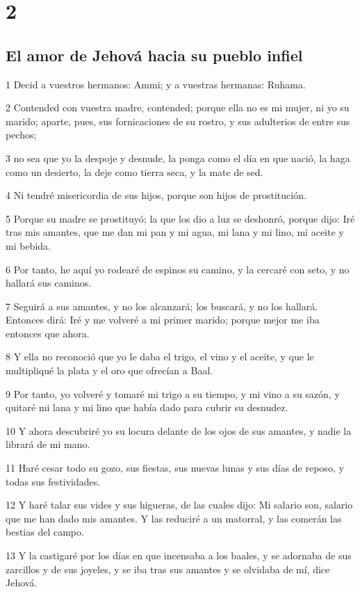 \chapter{2}

\section*{El amor de Jehová hacia su pueblo infiel}

\par 1 Decid a vuestros hermanos: Ammi; y a vuestras hermanas: Ruhama.
\par 2 Contended con vuestra madre, contended; porque ella no es mi mujer, ni yo su marido; aparte, pues, sus fornicaciones de su rostro, y sus adulterios de entre sus pechos;
\par 3 no sea que yo la despoje y desnude, la ponga como el día en que nació, la haga como un desierto, la deje como tierra seca, y la mate de sed.
\par 4 Ni tendré misericordia de sus hijos, porque son hijos de prostitución.
\par 5 Porque su madre se prostituyó; la que los dio a luz se deshonró, porque dijo: Iré tras mis amantes, que me dan mi pan y mi agua, mi lana y mi lino, mi aceite y mi bebida.
\par 6 Por tanto, he aquí yo rodearé de espinos su camino, y la cercaré con seto, y no hallará sus caminos.
\par 7 Seguirá a sus amantes, y no los alcanzará; los buscará, y no los hallará. Entonces dirá: Iré y me volveré a mi primer marido; porque mejor me iba entonces que ahora.
\par 8 Y ella no reconoció que yo le daba el trigo, el vino y el aceite, y que le multipliqué la plata y el oro que ofrecían a Baal.
\par 9 Por tanto, yo volveré y tomaré mi trigo a su tiempo, y mi vino a su sazón, y quitaré mi lana y mi lino que había dado para cubrir su desnudez.
\par 10 Y ahora descubriré yo su locura delante de los ojos de sus amantes, y nadie la librará de mi mano.
\par 11 Haré cesar todo su gozo, sus fiestas, sus nuevas lunas y sus días de reposo, y todas sus festividades.
\par 12 Y haré talar sus vides y sus higueras, de las cuales dijo: Mi salario son, salario que me han dado mis amantes. Y las reduciré a un matorral, y las comerán las bestias del campo.
\par 13 Y la castigaré por los días en que incensaba a los baales, y se adornaba de sus zarcillos y de sus joyeles, y se iba tras sus amantes y se olvidaba de mí, dice Jehová.
